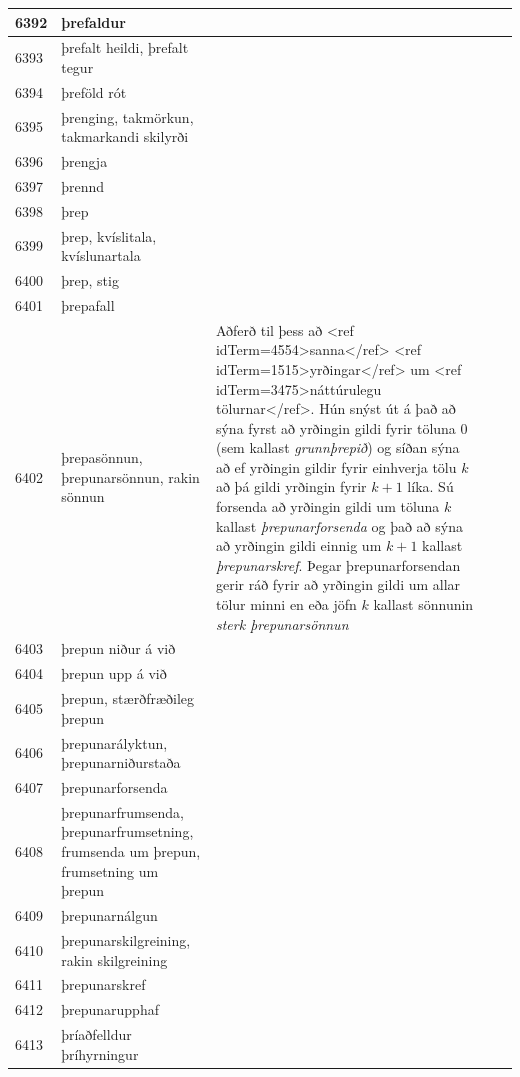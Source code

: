 \begin{longtable}{p{}|p{}|p{}|p{}|p{}}
\hline
6392 & þrefaldur &  &  &  \\
\hline
6393 & þrefalt heildi, þrefalt tegur &  &  &  \\
\hline
6394 & þreföld rót &  &  &  \\
\hline
6395 & þrenging, takmörkun, takmarkandi skilyrði &  &  &  \\
\hline
6396 & þrengja &  &  &  \\
\hline
6397 & þrennd &  &  &  \\
\hline
6398 & þrep &  &  &  \\
\hline
6399 & þrep, kvíslitala, kvíslunartala &  &  &  \\
\hline
6400 & þrep, stig &  &  &  \\
\hline
6401 & þrepafall &  &  &  \\
\hline
6402 & þrepasönnun, þrepunarsönnun, rakin sönnun & Aðferð til þess að <ref idTerm=4554>sanna</ref> <ref idTerm=1515>yrðingar</ref> um <ref idTerm=3475>náttúrulegu tölurnar</ref>. Hún snýst út á það að sýna fyrst að yrðingin gildi fyrir töluna 0 (sem kallast \textit{grunnþrepið}) og síðan sýna að ef yrðingin gildir fyrir einhverja tölu $k$ að þá gildi yrðingin fyrir $k+1$ líka. Sú forsenda að yrðingin gildi um töluna $k$ kallast \textit{þrepunarforsenda} og það að sýna að yrðingin gildi einnig um $k+1$ kallast \textit{þrepunarskref}. Þegar þrepunarforsendan gerir ráð fyrir að yrðingin gildi um allar tölur minni en eða jöfn $k$ kallast sönnunin \textit{sterk þrepunarsönnun} &  &  \\
\hline
6403 & þrepun niður á við &  &  &  \\
\hline
6404 & þrepun upp á við &  &  &  \\
\hline
6405 & þrepun, stærðfræðileg þrepun &  &  &  \\
\hline
6406 & þrepunarályktun, þrepunarniðurstaða &  &  &  \\
\hline
6407 & þrepunarforsenda &  &  &  \\
\hline
6408 & þrepunarfrumsenda, þrepunarfrumsetning, frumsenda um þrepun, frumsetning um þrepun &  &  &  \\
\hline
6409 & þrepunarnálgun &  &  &  \\
\hline
6410 & þrepunarskilgreining, rakin skilgreining &  &  &  \\
\hline
6411 & þrepunarskref &  &  &  \\
\hline
6412 & þrepunarupphaf &  &  &  \\
\hline
6413 & þríaðfelldur þríhyrningur &  &  &  \\

\end{longtable}
